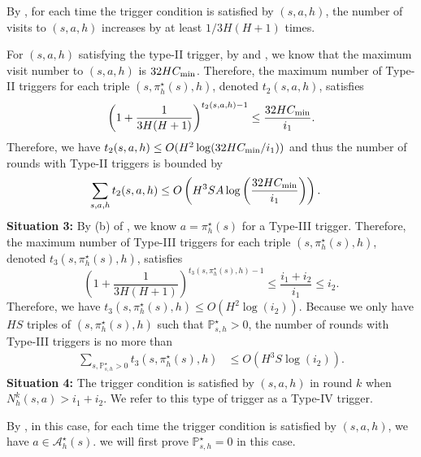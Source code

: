 \documentclass{article}
\begin{document}
    By , for each time the trigger condition is satisfied by $(s,a,h)$, the number of visits to $(s,a,h)$ increases by at least $1/3H(H+1)$ times. 
    
    For $(s,a,h)$ satisfying the type-II trigger, by  and , we know that the maximum visit number to $(s,a,h)$ is $32HC_{\textnormal{min}}$. Therefore, the maximum number of Type-II triggers for each triple $(s,\pi_h^{\star}(s),h)$, denoted $t_{2}(s,a,h)$, satisfies
    $$ \left( 1+ \frac{1}{3H(H+1)}\right)^{t_{2}(s,a,h)-1} \leq \frac{32HC_{\textnormal{min}}}{i_1} .$$
    Therefore, we have $t_{2}(s,a,h)  \leq O(H^2\log(32HC_{\textnormal{min}}/i_1))$ and thus the number of rounds with Type-II triggers is bounded by
    \begin{align*}
        \sum_{s,a,h }t_{2}(s,a,h) &\leq  O\left(H^3SA\log\left(\frac{32HC_{\textnormal{min}}}{i_1}\right)\right).
    \end{align*}
 \textbf{Situation 3:} By (b) of , we know $a = \pi_h^{\star}(s)$ for a Type-III trigger. Therefore, the maximum number of Type-III triggers for each triple $(s,\pi_h^{\star}(s),h)$, denoted $t_{3}(s,\pi_h^{\star}(s),h)$, satisfies
    $$ \left( 1+ \frac{1}{3H(H+1)}\right)^{t_{3}(s,\pi_h^{\star}(s),h)-1} \leq \frac{i_1+i_2}{i_1} \leq i_2 .$$
    Therefore, we have
    $t_{3}(s,\pi_h^{\star}(s),h) \leq O(H^2\log(i_2)) .$
    Because we only have $HS$ triples of $(s,\pi_h^{\star}(s),h)$ such that \( \mathbb{P}_{s,h}^{\star} > 0 \), the number of rounds with Type-III triggers is no more than
    \begin{align*}
        \sum_{s,\mathbb{P}_{s,h}^{\star} >0 }t_{3}(s,\pi_h^{\star}(s),h) &\leq O\left(H^3S\log\left(i_2\right)\right).
    \end{align*}
  \textbf{Situation 4:} The trigger condition is satisfied by $(s,a,h)$ in round $k$ when $N_h^k(s,a) > i_1 + i_2$. We refer to this type of trigger as a Type-IV trigger.

    By , in this case, for each time the trigger condition is satisfied by $(s,a,h)$, we have $a \in \mathcal{A}_h^{\star}(s)$. 
    we will first prove $\mathbb{P}_{s,h}^{\star} = 0$ in this case.   
    
\end{document}
